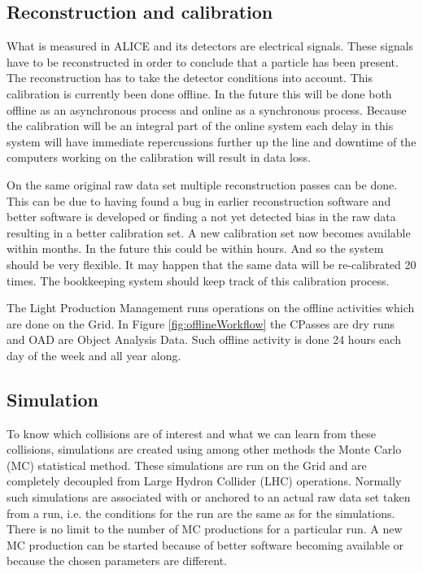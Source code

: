 \subsection{Reconstruction and calibration}
What is measured in ALICE and its detectors are electrical signals. These signals have to be reconstructed in order to conclude that a particle has been present. The reconstruction has to take the detector conditions into account. This calibration is currently been done offline. In the future this will be done both offline as an asynchronous process and online as a synchronous process. Because the calibration will be an integral part of the online system each delay in this system will have immediate repercussions further up the line and downtime of the computers working on the calibration will result in data loss.

On the same original raw data set multiple reconstruction passes can be done. This can be due to having found a bug in earlier reconstruction software and better software is developed or finding a not yet detected bias in the raw data resulting in a better calibration set. A new calibration set now becomes available within months. In the future this could be within hours. And so the system should be very flexible. It may happen that the same data will be re-calibrated 20 times. The bookkeeping system should keep track of this calibration process.

The Light Production Management runs operations on the offline activities which are done on the Grid. In Figure \ref{fig:offlineWorkflow} the CPasses are dry runs and OAD are Object Analysis Data. Such offline activity is done 24 hours each day of the week and all year along.


\subsection{Simulation}
To know which collisions are of interest and what we can learn from these collisions, simulations are created using among other methods the Monte Carlo (MC) statistical method. These simulations are run on the Grid and are completely decoupled from Large Hydron Collider (LHC) operations. Normally such simulations are associated with or anchored to an actual raw data set taken from a run, i.e. the conditions for the run are the same as for the simulations. There is no limit to the number of MC productions for a particular run. A new MC production can be started because of better software becoming available or because the chosen parameters are different.



